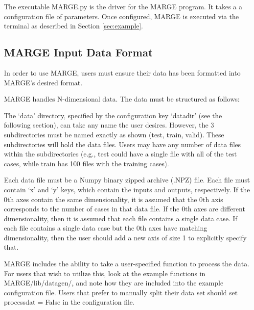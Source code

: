\documentclass[letterpaper, 12pt]{article}
\begin{document}
The executable MARGE.py is the driver for the MARGE program. It takes a 
a configuration file of parameters.  Once configured, MARGE is executed via 
the terminal as described in Section \ref{sec:example}.


\subsection{MARGE Input Data Format}
In order to use MARGE, users must ensure their data has been formatted into 
MARGE's desired format.\newline

\noindent MARGE handles N-dimensional data.  The data must be structured as 
follows:

\noindent{}
\vspace{0.7cm}

\noindent The `data' directory, specified by the configuration key `datadir'
(see the following section), can take any name the user desires.  However, 
the 3 subdirectories must be named exactly as shown (test, train, 
valid).  These subdirectories will hold the data files. Users may have any 
number of data files within the subdirectories (e.g., test could have a single 
file with all of the test cases, while train has 100 files with the training 
cases). \newline

\noindent Each data file must be a Numpy binary zipped archive (.NPZ) file.  
Each file must contain `x' and `y' keys, which contain the inputs and outputs, 
respectively.  If the 0th axes contain the same dimensionality, it is assumed 
that the 0th axis corresponds to the number of cases in that data file.  If the 
0th axes are different dimensionality, then it is assumed that each file contains 
a single data case.  If each file contains a single data case but the 0th axes 
have matching dimensionality, then the user should add a new axis of size 1
to explicitly specify that.

\noindent MARGE includes the ability to take a user-specified function to 
process the data.  For users that wish to utilize this, look at the example 
functions in MARGE/lib/datagen/, and note how they are included into the 
example configuration file.  Users that prefer to manually split their 
data set should set processdat = False in the configuration file.
\end{document}
